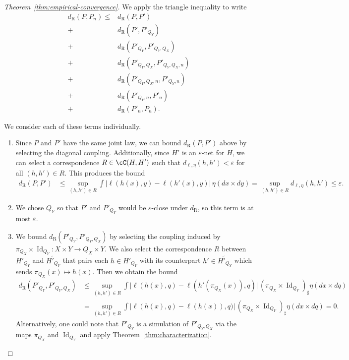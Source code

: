 \documentclass[twoside,11pt]{article}
\DeclareMathOperator{\id}{Id}
\newcommand{\dexp}[1][]{d_{\mathrm{R}#1}}
\renewcommand{\epsilon}{\varepsilon}
\begin{document}
\begin{proof}[Theorem~\ref{thm:empirical-convergence}]
    We apply the triangle inequality to write
    \begin{align*}
        \dexp(P,P_n) \leq & \dexp(P,P') \tag{1}
        \\
        + & \dexp(P',P'_{Q_Y}) \tag{2}
        \\
        + & \dexp(P'_{Q_Y},P'_{Q_Y,Q_X}) \tag{3}
        \\
        + & \dexp(P'_{Q_Y,Q_X},P'_{Q_Y,Q_X,n}) \tag{4}
        \\
        + & \dexp(P'_{Q_Y,Q_X,n},P'_{Q_Y,n}) \tag{5}
        \\
        + & \dexp(P'_{Q_Y,n},P'_n) \tag{6}
        \\
        + & \dexp(P'_n,P_n) \tag{7}.
    \end{align*}

    We consider each of these terms individually.

    \begin{enumerate}[(1)]
    \item Since $P$ and $P'$ have the same joint law, we can bound $\dexp(P,P')$ above by selecting the diagonal coupling. Additionally, since $H'$ is an $\epsilon$-net for $H$, we can select a correspondence $R\in \cC(H,H')$ such that $d_{\ell,\eta}(h,h')<\epsilon$ for all $(h,h')\in R$. This produces the bound
    \begin{align*}
        \dexp(P,P') 
        &
        \leq \sup_{(h,h')\in R} \int \big| \ell(h(x),y) - \ell(h'(x),y) \big|\, \eta(dx\times dy)
        = \sup_{(h,h')\in R} d_{\ell,\eta}(h,h') \leq \epsilon.
    \end{align*}

    \item We chose $Q_Y$ so that $P'$ and $P'_{Q_Y}$ would be $\epsilon$-close under $\dexp$, so this term is at most $\epsilon$.

    \item We bound $\dexp(P'_{Q_Y}, P'_{Q_Y,Q_X})$ by selecting the coupling induced by $\pi_{Q_X} \times \id_{Q_Y}: X\times Y \to Q_X\times Y$. We also select the correspondence $R$ between $H'_{Q_Y}$ and $\widetilde{H'_{Q_Y}}$ that pairs each $h\in H'_{Q_Y}$ with its counterpart $h'\in \widetilde{H'_{Q_Y}}$ which sends $\pi_{Q_X}(x)\mapsto h(x)$. Then we obtain the bound
    \begin{align*}
        \dexp(P'_{Q_Y}, P'_{Q_Y,Q_X})
        &
        \leq \sup_{(h,h')\in R} \int \big| \ell(h(x),q) - \ell(h'(\pi_{Q_X}(x)),q) \big|\, (\pi_{Q_X}\times \id_{Q_Y})_\sharp \eta (dx\times dq)\\
        &
        = \sup_{(h,h')\in R} \int \big| \ell(h(x),q) - \ell(h(x)),q) \big|\, (\pi_{Q_X}\times \id_{Q_Y})_\sharp \eta (dx\times dq) = 0.
    \end{align*}
    Alternatively, one could note that $P'_{Q_Y}$ is a simulation of $P'_{Q_Y,Q_X}$ via the maps $\pi_{Q_X}$ and $\id_{Q_Y}$ and apply Theorem~\ref{thm:characterization}.


\end{enumerate}
\end{proof}
\end{document}
